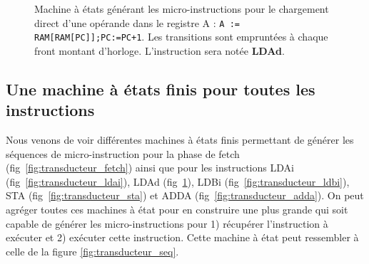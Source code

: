 \begin{figure}[htbp]
  \centering{}
  \caption{\label{fig:transducteur_ldad} Machine à états générant les micro-instructions pour le chargement direct d'une opérande dans le registre A : \texttt{A := RAM[RAM[PC]];PC:=PC+1}. Les transitions sont empruntées à chaque front montant d'horloge. L'instruction sera notée \textbf{LDAd}.}
\end{figure}

\subsection{Une machine à états finis pour toutes les instructions}

Nous venons de voir différentes machines à états finis permettant de générer les séquences de micro-instruction pour la phase de fetch (fig~\ref{fig:transducteur_fetch}) ainsi que pour les instructions LDAi (fig~\ref{fig:transducteur_ldai}), LDAd (fig~\ref{fig:transducteur_ldad}), LDBi (fig~\ref{fig:transducteur_ldbi}), STA (fig~\ref{fig:transducteur_sta}) et ADDA (fig~\ref{fig:transducteur_adda}). On peut agréger toutes ces machines à état pour en construire une plus grande qui soit capable de générer les micro-instructions pour 1) récupérer l'instruction à exécuter et 2) exécuter cette instruction. Cette machine à état peut ressembler à celle de la figure \ref{fig:transducteur_seq}.

